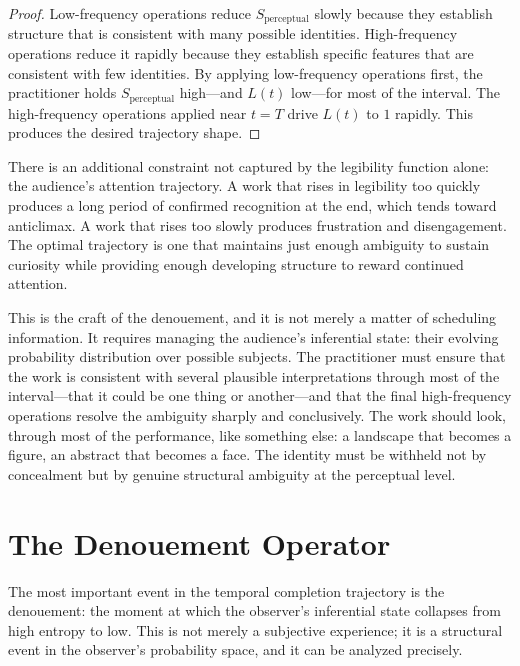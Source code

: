 \documentclass[11pt, twoside]{article}
\theoremstyle{plain}
\theoremstyle{definition}
\theoremstyle{remark}
\begin{document}
\begin{proof}
Low-frequency operations reduce $S_{\text{perceptual}}$ slowly because they establish structure that is consistent with many possible identities. High-frequency operations reduce it rapidly because they establish specific features that are consistent with few identities. By applying low-frequency operations first, the practitioner holds $S_{\text{perceptual}}$ high---and $L(t)$ low---for most of the interval. The high-frequency operations applied near $t = T$ drive $L(t)$ to $1$ rapidly. This produces the desired trajectory shape.
\end{proof}

There is an additional constraint not captured by the legibility function alone: the audience's attention trajectory. A work that rises in legibility too quickly produces a long period of confirmed recognition at the end, which tends toward anticlimax. A work that rises too slowly produces frustration and disengagement. The optimal trajectory is one that maintains just enough ambiguity to sustain curiosity while providing enough developing structure to reward continued attention.

This is the craft of the denouement, and it is not merely a matter of scheduling information. It requires managing the audience's inferential state: their evolving probability distribution over possible subjects. The practitioner must ensure that the work is consistent with several plausible interpretations through most of the interval---that it could be one thing or another---and that the final high-frequency operations resolve the ambiguity sharply and conclusively. The work should look, through most of the performance, like something else: a landscape that becomes a figure, an abstract that becomes a face. The identity must be withheld not by concealment but by genuine structural ambiguity at the perceptual level.

\section{The Denouement Operator}
\label{sec:denouement}

The most important event in the temporal completion trajectory is the denouement: the moment at which the observer's inferential state collapses from high entropy to low. This is not merely a subjective experience; it is a structural event in the observer's probability space, and it can be analyzed precisely.
\end{document}

